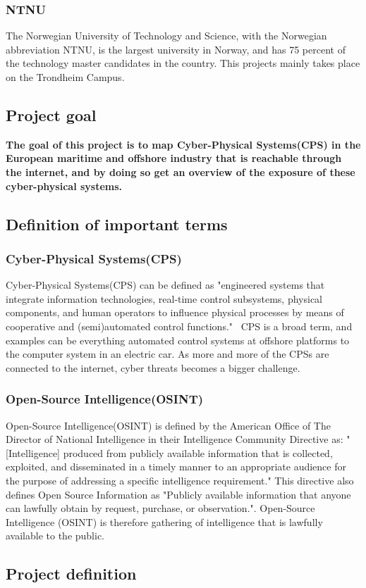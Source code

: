 \subsubsection{NTNU}\label{sec:ntnu}
The Norwegian University of Technology and Science, with the Norwegian abbreviation NTNU, is the largest university in Norway, and has 75 percent of the technology master candidates in the country. This projects mainly takes place on the Trondheim Campus.


\subsection{Project goal}\label{sec:goal}
\textbf{The goal of this project is to map Cyber-Physical Systems(CPS) in the European maritime and offshore industry that is reachable through the internet, and by doing so get an overview of the exposure of these cyber-physical systems.}


\subsection{Definition of important terms} \label{sec:definitions}

\subsubsection{Cyber-Physical Systems(CPS)}\label{sec:cps}
Cyber-Physical Systems(CPS) can be defined as "engineered systems that integrate information technologies, real‐time control subsystems, physical components, and human operators to influence physical processes by means of cooperative and (semi)automated control functions."~\cite{guzman_wied_kozine_lundteigen_2019}
CPS is a broad term, and examples can be everything automated control systems at offshore platforms to the computer system in an electric car. As more and more of the CPSs are connected to the internet, cyber threats becomes a bigger challenge. 

\subsubsection{Open-Source Intelligence(OSINT)}\label{sec:osint}
Open-Source Intelligence(OSINT) is defined by the American Office of The Director of National Intelligence in their Intelligence Community Directive as: "[Intelligence] produced from publicly available information that is collected, exploited, and disseminated in a timely manner to an appropriate audience for the purpose of addressing a specific intelligence requirement."\cite{directive_301} This directive also defines Open Source Information as "Publicly available information that anyone can lawfully obtain by request, purchase, or observation.". Open-Source Intelligence (OSINT) is therefore gathering of intelligence that is lawfully available to the public. 


\subsection{Project definition}



